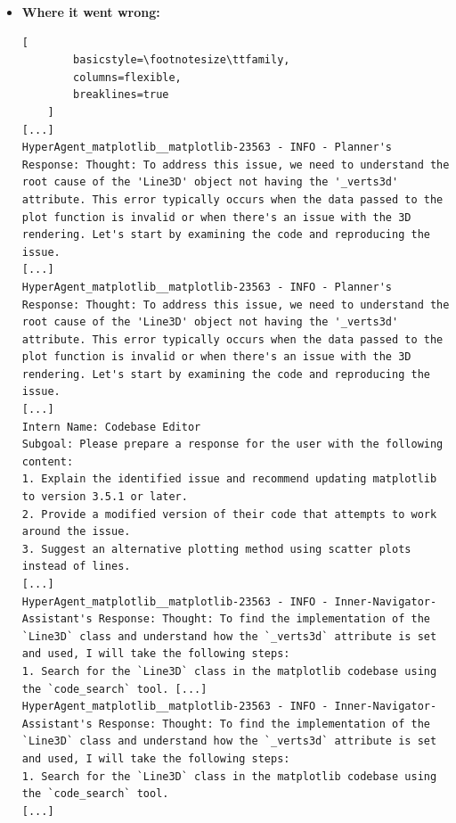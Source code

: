 \begin{itemize}
    \item \textbf{Where it went wrong:}
    \begin{lstlisting}[
        basicstyle=\footnotesize\ttfamily,
        columns=flexible,
        breaklines=true
    ]
[...]
HyperAgent_matplotlib__matplotlib-23563 - INFO - Planner's Response: Thought: To address this issue, we need to understand the root cause of the 'Line3D' object not having the '_verts3d' attribute. This error typically occurs when the data passed to the plot function is invalid or when there's an issue with the 3D rendering. Let's start by examining the code and reproducing the issue.
[...]
HyperAgent_matplotlib__matplotlib-23563 - INFO - Planner's Response: Thought: To address this issue, we need to understand the root cause of the 'Line3D' object not having the '_verts3d' attribute. This error typically occurs when the data passed to the plot function is invalid or when there's an issue with the 3D rendering. Let's start by examining the code and reproducing the issue.
[...]
Intern Name: Codebase Editor
Subgoal: Please prepare a response for the user with the following content:
1. Explain the identified issue and recommend updating matplotlib to version 3.5.1 or later.
2. Provide a modified version of their code that attempts to work around the issue.
3. Suggest an alternative plotting method using scatter plots instead of lines.
[...]
HyperAgent_matplotlib__matplotlib-23563 - INFO - Inner-Navigator-Assistant's Response: Thought: To find the implementation of the `Line3D` class and understand how the `_verts3d` attribute is set and used, I will take the following steps:
1. Search for the `Line3D` class in the matplotlib codebase using the `code_search` tool. [...]
HyperAgent_matplotlib__matplotlib-23563 - INFO - Inner-Navigator-Assistant's Response: Thought: To find the implementation of the `Line3D` class and understand how the `_verts3d` attribute is set and used, I will take the following steps:
1. Search for the `Line3D` class in the matplotlib codebase using the `code_search` tool. 
[...]
    \end{lstlisting}
\end{itemize}







